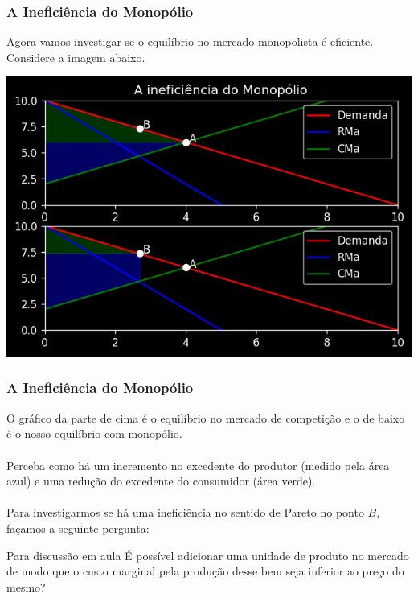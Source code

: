 \documentclass{beamer}[10]
\begin{document}
\begin{frame}
	\frametitle{A Ineficiência do Monopólio}
	
	Agora vamos investigar se o equilíbrio no mercado monopolista é eficiente. Considere a imagem abaixo.
	\begin{center}
		\includegraphics[scale=0.6]{cap25_4-inef_monopolio.png}
	\end{center}
\end{frame}

\begin{frame}
	\frametitle{A Ineficiência do Monopólio}
	
	O gráfico da parte de cima é o equilíbrio no mercado de competição e o de baixo é o nosso equilíbrio com monopólio.
	\\~\\
	Perceba como há um incremento no excedente do produtor (medido pela área azul) e uma redução do excedente do consumidor (área verde).
	\\~\\
	Para investigarmos se há uma ineficiência no sentido de Pareto no ponto $B$, façamos a seguinte pergunta: 
	\begin{block}{Para discussão em aula}
		É possível adicionar uma unidade de produto no mercado de modo que o custo marginal pela produção desse bem seja inferior ao preço do mesmo?
	\end{block}	
\end{frame}
\end{document}
